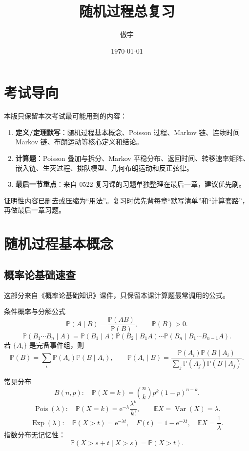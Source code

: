 \documentclass[12pt,a4paper,openany]{ctexrep}
\title{随机过程总复习}
\author{傲宇}
\date{\today}
\theoremstyle{definition}
\newcommand{\E}{\mathbb{E}}
\newcommand{\Var}{\operatorname{Var}}
\newcommand{\Pp}{\mathbb{P}}
\newcommand{\Pois}{\operatorname{Pois}}
\newcommand{\Exp}{\operatorname{Exp}}
\newcommand{\e}{\mathrm{e}}
\begin{document}
\maketitle
\tableofcontents
\clearpage

\chapter*{考试导向}

本版只保留本次考试最可能用到的内容：
\begin{enumerate}[label=(\arabic*)]
	\item \textbf{定义/定理默写}：随机过程基本概念、Poisson 过程、Markov 链、连续时间 Markov 链、布朗运动等核心定义和结论。
	\item \textbf{计算题}：Poisson 叠加与拆分、Markov 平稳分布、返回时间、转移速率矩阵、嵌入链、生灭过程、排队模型、几何布朗运动和反正弦律。
	\item \textbf{最后一节重点}：来自 0522 复习课的习题单独整理在最后一章，建议优先刷。
\end{enumerate}

证明性内容已删去或压缩为“用法”。复习时优先背每章“默写清单”和“计算套路”，再做最后一章习题。

\chapter{随机过程基本概念}

\section{概率论基础速查}

这部分来自《概率论基础知识》课件，只保留本课计算题最常调用的公式。

\begin{reviewbox}{条件概率与分解公式}
\[
\Pp(A\mid B)=\frac{\Pp(AB)}{\Pp(B)},\qquad \Pp(B)>0.
\]
\[
\Pp(B_1\cdots B_n\mid A)
=\Pp(B_1\mid A)\Pp(B_2\mid B_1A)\cdots
\Pp(B_n\mid B_1\cdots B_{n-1}A).
\]
若 $\{A_i\}$ 是完备事件组，则
\[
\Pp(B)=\sum_i\Pp(A_i)\Pp(B\mid A_i),\qquad
\Pp(A_i\mid B)=\frac{\Pp(A_i)\Pp(B\mid A_i)}
{\sum_j\Pp(A_j)\Pp(B\mid A_j)}.
\]
\end{reviewbox}

\begin{reviewbox}{常见分布}
\[
B(n,p):\quad \Pp(X=k)=\binom nkp^k(1-p)^{n-k}.
\]
\[
\Pois(\lambda):\quad \Pp(X=k)=\e^{-\lambda}\frac{\lambda^k}{k!},\qquad
\E X=\Var(X)=\lambda.
\]
\[
\Exp(\lambda):\quad \Pp(X>t)=\e^{-\lambda t},\quad
F(t)=1-\e^{-\lambda t},\quad \E X=\frac1\lambda.
\]
指数分布无记忆性：
\[
\Pp(X>s+t\mid X>s)=\Pp(X>t).
\]
\end{reviewbox}
\end{document}

